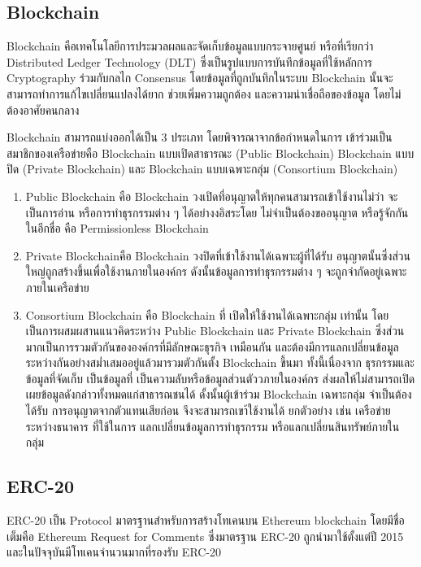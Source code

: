 \documentclass[12pt,oneside,openright,a4paper]{cpe-thai-project}
\begin{document}
\subsection{Blockchain \cite{blockchain}} 
\tab Blockchain คือเทคโนโลยีการประมวลผลและจัดเก็บข้อมูลแบบกระจายศูนย์ หรือที่เรียกว่า Distributed Ledger Technology (DLT) ซึ่งเป็นรูปแบบการบันทึกข้อมูลที่ใช้หลักการ Cryptography ร่วมกับกลไก Consensus โดยข้อมูลที่ถูกบันทึกในระบบ Blockchain นั้นจะสามารถทำการแก้ไขเปลี่ยนแปลงได้ยาก ช่วยเพิ่มความถูกต้อง และความน่าเชื่อถือของข้อมูล โดยไม่ต้องอาศัยคนกลาง

\tab Blockchain สามารถแบ่งออกได้เป็น 3 ประเภท โดยพิจารณาจากข้อกำหนดในการ เข้าร่วมเป็นสมาชิกของเครือข่ายคือ Blockchain แบบเปิดสาธารณะ (Public Blockchain) Blockchain แบบปิด (Private Blockchain) และ Blockchain แบบเฉพาะกลุ่ม (Consortium Blockchain) 
\begin{enumerate}[label=\thesubsection.\arabic*,leftmargin=0pt,itemindent=2cm]
\item Public Blockchain คือ Blockchain วงเปิดที่อนุญาตให้ทุกคนสามารถเข้าใช้งานไม่ว่า จะเป็นการอ่าน หรือการทำธุรกรรมต่าง ๆ ได้อย่างงอิสระโดย ไม่จำเป็นต้องขออนุญาต หรือรู้จักกันในอีกชื่อ คือ Permissionless Blockchain
\item Private Blockchainคือ Blockchain วงปิดที่เข้าใช้งานได้เฉพาะผู้ที่ได้รับ อนุญาตนั้นซึ่งส่วนใหญ่ถูกสร้างขึ้นเพื่อใช้งานภายในองค์กร ดังนั้นข้อมูลการทำธุรกรรมต่าง ๆ จะถูกจํากัดอยู่เฉพาะภายในเครือข่าย
\item Consortium Blockchain คือ Blockchain ที่ เปิดให้ใช้งานได้เฉพาะกลุ่ม เท่านั้น โดยเป็นการผสมผสานแนวคิดระหว่าง Public Blockchain และ Private Blockchain ซึ่งส่วนมากเป็นการรวมตัวกันขององค์กรที่มีลักษณะธุรกิจ เหมือนกัน และต้องมีการแลกเปลี่ยนข้อมูลระหว่างกันอย่างสม่ำเสมออยู่แล้วมารวมตัวกันตั้ง Blockchain ขึ้นมา ทั้งนี้เนื่องจาก ธุรกรรมและข้อมูลที่จัดเก็บ เป็นข้อมูลที่ เป็นความลับหรือข้อมูลส่วนตัววภายในองค์กร ส่งผลให้ไม่สามารถเปิดเผยข้อมูลดังกล่าวทั้งหมดแก่สาธารณชนได้ ดั้งนั้นผู้เข้าร่วม Blockchain เฉพาะกลุ่ม จำเป็นต้องได้รับ การอนุญาตจากตัวแทนเสียก่อน จึงจะสามารถเขา้ใช้งานได้ ยกตัวอย่าง เช่น เครือข่ายระหว่างธนาคาร ที่ใช้ในการ แลกเปลี่ยนข้อมูลการทำธุรกรรม หรือแลกเปลี่ยนสินทรัพย์ภายในกลุ่ม
\end{enumerate}

\subsection{ERC-20 \cite{erc20}}
\tab ERC-20 เป็น Protocol มาตรฐานสําหรับการสร้างโทเคนบน Ethereum blockchain โดยมีชื่อเต็มคือ Ethereum Request for Comments ซึ่งมาตรฐาน ERC-20 ถูกนํามาใช้ตั้งแต่ปี 2015 และในปัจจุบันมีโทเคนจํานวนมากที่รองรับ ERC-20
\end{document}
